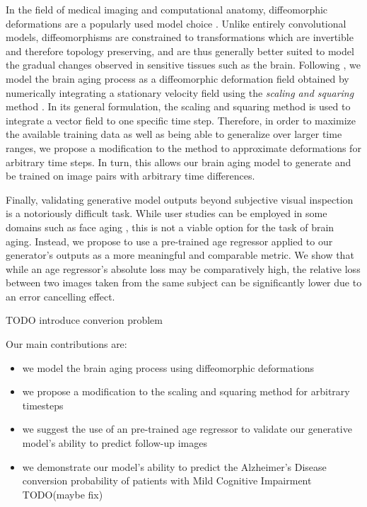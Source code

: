 In the field of medical imaging and computational anatomy, diffeomorphic deformations are a popularly used model choice \cite{beg2005computing} \cite{ashburner2007fast}. Unlike entirely convolutional models, diffeomorphisms are constrained to transformations which are invertible and therefore topology preserving, and are thus generally better suited to model the gradual changes observed in sensitive tissues such as the brain. Following \cite{dalca2018unsupervised}, we model the brain aging process as a diffeomorphic deformation field obtained by numerically integrating a stationary velocity field using the \textit{scaling and squaring} method \cite{arsigny2006log}. In its general formulation, the scaling and squaring method is used to integrate a vector field to one specific time step. Therefore, in order to maximize the available training data as well as being able to generalize over larger time ranges, we propose a modification to the method to approximate deformations for arbitrary time steps. In turn, this allows our brain aging model to generate and be trained on image pairs with arbitrary time differences. 

Finally, validating generative model outputs beyond subjective visual inspection is a notoriously difficult task. While user studies can be employed in some domains such as face aging \cite{palsson2018generative}, this is not a viable option for the task of brain aging. Instead, we propose to use a pre-trained age regressor applied to our generator's outputs as a more meaningful and comparable metric. We show that while an age regressor's absolute loss may be comparatively high, the relative loss between two images taken from the same subject can be significantly lower due to an error cancelling effect.

TODO introduce converion problem

Our main contributions are:

\begin{itemize}
	\item we model the brain aging process using diffeomorphic deformations%
	\item we propose a modification to the scaling and squaring method for arbitrary timesteps
	\item we suggest the use of an pre-trained age regressor to validate our generative model's ability to predict follow-up images
	\item we demonstrate our model's ability to predict the Alzheimer's Disease conversion probability of patients with Mild Cognitive Impairment TODO(maybe fix)
\end{itemize}

